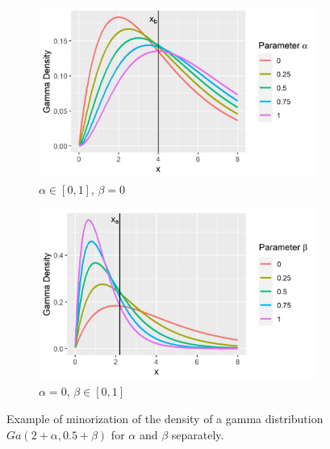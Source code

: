 \documentclass[11pt]{article}
\begin{document}
	
	\begin{figure}
		\centering
		\begin{subfigure}[b]{0.45\textwidth}
			\centering
			\includegraphics[width=\textwidth]{gamma_minorization_1a.jpg}
			\caption{$\alpha \in [0, 1]$, $\beta=0$}
			\label{fig:gam1a}
		\end{subfigure}
		\hfill
		\begin{subfigure}[b]{0.49\textwidth}
			\centering
			\includegraphics[width=\textwidth]{gamma_minorization_1b.jpg}
			\caption{$\alpha = 0$, $\beta \in [0, 1]$}
			\label{fig:gam1b}
		\end{subfigure}
		\caption{Example of minorization of the density of a gamma distribution $Ga(2+\alpha, 0.5+\beta)$ for $\alpha$ and $\beta$ separately.}
		\label{fig:gam1}
	\end{figure}
	
\end{document}
